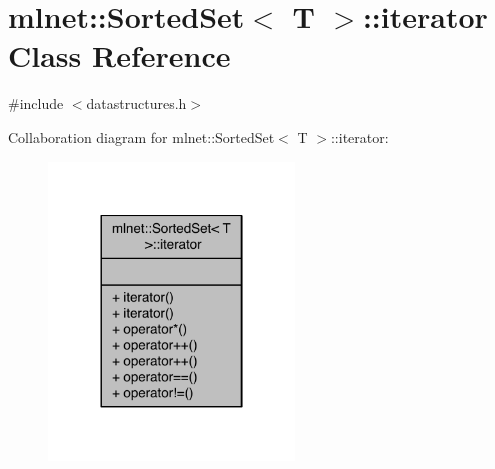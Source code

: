 \hypertarget{classmlnet_1_1_sorted_set_1_1iterator}{\section{mlnet\+:\+:Sorted\+Set$<$ T $>$\+:\+:iterator Class Reference}
\label{classmlnet_1_1_sorted_set_1_1iterator}
}


{\ttfamily \#include $<$datastructures.\+h$>$}



Collaboration diagram for mlnet\+:\+:Sorted\+Set$<$ T $>$\+:\+:iterator\+:\nopagebreak
\begin{figure}[H]
\begin{center}
\leavevmode
\includegraphics[width=185pt]{classmlnet_1_1_sorted_set_1_1iterator__coll__graph}
\end{center}
\end{figure}

